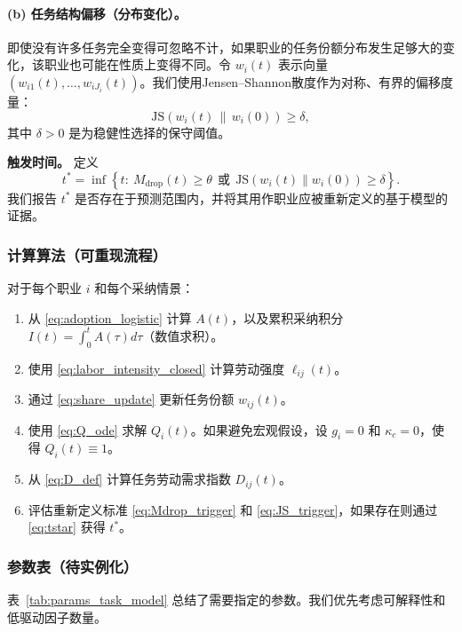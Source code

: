 \paragraph{(b) 任务结构偏移（分布变化）。}
即使没有许多任务完全变得可忽略不计，如果职业的任务份额分布发生足够大的变化，该职业也可能在性质上变得不同。令 $w_i(t)$ 表示向量 $(w_{i1}(t),\dots,w_{iJ_i}(t))$。我们使用Jensen--Shannon散度作为对称、有界的偏移度量：
\begin{equation}
\label{eq:JS_trigger}
\mathrm{JS}\!\left(w_i(t)\,\|\,w_i(0)\right) \ge \delta,
\end{equation}
其中 $\delta>0$ 是为稳健性选择的保守阈值。

\indent\textbf{触发时间。} 定义
\begin{equation}
\label{eq:tstar}
t^*=\inf\left\{t:\ M_{\text{drop}}(t)\ge\theta\ \ \text{或}\ \ \mathrm{JS}(w_i(t)\|w_i(0))\ge\delta\right\}.
\end{equation}
我们报告 $t^*$ 是否存在于预测范围内，并将其用作职业应被重新定义的基于模型的证据。

\subsubsection{计算算法（可重现流程）}
\label{sec:algorithm}
对于每个职业 $i$ 和每个采纳情景：
\begin{enumerate}
  \item 从 \eqref{eq:adoption_logistic} 计算 $A(t)$，以及累积采纳积分 $I(t)=\int_0^t A(\tau)d\tau$（数值求积）。
  \item 使用 \eqref{eq:labor_intensity_closed} 计算劳动强度 $\ell_{ij}(t)$。
  \item 通过 \eqref{eq:share_update} 更新任务份额 $w_{ij}(t)$。
  \item 使用 \eqref{eq:Q_ode} 求解 $Q_i(t)$。如果避免宏观假设，设 $g_i=0$ 和 $\kappa_c=0$，使得 $Q_i(t)\equiv 1$。
  \item 从 \eqref{eq:D_def} 计算任务劳动需求指数 $D_{ij}(t)$。
  \item 评估重新定义标准 \eqref{eq:Mdrop_trigger} 和 \eqref{eq:JS_trigger}，如果存在则通过 \eqref{eq:tstar} 获得 $t^*$。
\end{enumerate}

\subsubsection{参数表（待实例化）}
\label{sec:param_table}
表~\ref{tab:params_task_model} 总结了需要指定的参数。我们优先考虑可解释性和低驱动因子数量。

